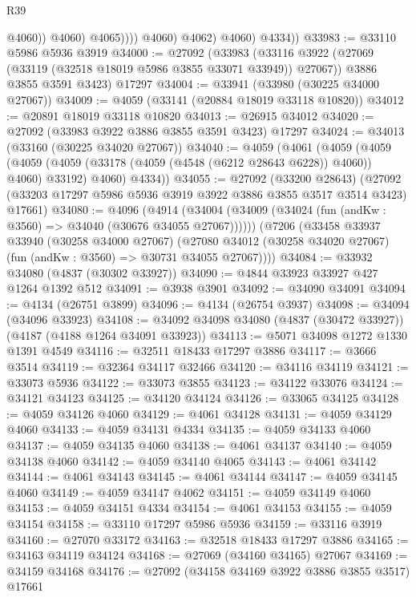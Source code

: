 \begin{lexlean}{R39}
\begin{coremodule}
                            @4060))
                        @4060)
                      @4065))))
              @4060)
            @4062)
          @4060)
        @4334))
@33983 := @33110 @5986 @5936 @3919
@34000 := @27092
    (@33983
      (@33116 @3922 (@27069 (@33119 (@32518 @18019 @5986 @3855 @33071 @33949)) @27067))
      @3886
      @3855
      @3591
      @3423)
    @17297
@34004 := @33941 (@33980 (@30225 @34000 @27067))
@34009 := @4059 (@33141 (@20884 @18019 @33118 @10820))
@34012 := @20891 @18019 @33118 @10820
@34013 := @26915 @34012
@34020 := @27092 (@33983 @3922 @3886 @3855 @3591 @3423) @17297
@34024 := @34013 (@33160 (@30225 @34020 @27067))
@34040 := @4059
    (@4061
      (@4059
        (@4059
          (@4059 (@4059 (@33178 (@4059 (@4548 (@6212 @28643 @6228)) @4060)) @4060) @33192)
          @4060)
        @4334))
@34055 := @27092
    (@33200 @28643)
    (@27092 (@33203 @17297 @5986 @5936 @3919 @3922 @3886 @3855 @3517 @3514 @3423) @17661)
@34080 := @4096
    (@4914 (@34004 (@34009 (@34024 (fun (andKw : @3560) => @34040 (@30676 @34055 @27067))))))
    (@7206
      (@33458
        @33937
        @33940
        (@30258 @34000 @27067)
        (@27080 @34012 (@30258 @34020 @27067) (fun (andKw : @3560) => @30731 @34055 @27067))))
@34084 := @33932 @34080 (@4837 (@30302 @33927))
@34090 := @4844 @33923 @33927 @427 @1264 @1392 @512
@34091 := @3938 @3901
@34092 := @34090 @34091
@34094 := @4134 (@26751 @3899)
@34096 := @4134 (@26754 @3937)
@34098 := @34094 (@34096 @33923)
@34108 := @34092 @34098 @34080 (@4837 (@30472 @33927)) (@4187 (@4188 @1264 @34091 @33923))
@34113 := @5071 @34098 @1272 @1330 @1391 @4549
@34116 := @32511 @18433 @17297 @3886
@34117 := @3666 @3514
@34119 := @32364 @34117 @32466
@34120 := @34116 @34119
@34121 := @33073 @5936
@34122 := @33073 @3855
@34123 := @34122 @33076
@34124 := @34121 @34123
@34125 := @34120 @34124
@34126 := @33065 @34125
@34128 := @4059 @34126 @4060
@34129 := @4061 @34128
@34131 := @4059 @34129 @4060
@34133 := @4059 @34131 @4334
@34135 := @4059 @34133 @4060
@34137 := @4059 @34135 @4060
@34138 := @4061 @34137
@34140 := @4059 @34138 @4060
@34142 := @4059 @34140 @4065
@34143 := @4061 @34142
@34144 := @4061 @34143
@34145 := @4061 @34144
@34147 := @4059 @34145 @4060
@34149 := @4059 @34147 @4062
@34151 := @4059 @34149 @4060
@34153 := @4059 @34151 @4334
@34154 := @4061 @34153
@34155 := @4059 @34154
@34158 := @33110 @17297 @5986 @5936
@34159 := @33116 @3919
@34160 := @27070 @33172
@34163 := @32518 @18433 @17297 @3886
@34165 := @34163 @34119 @34124
@34168 := @27069 (@34160 @34165) @27067
@34169 := @34159 @34168
@34176 := @27092 (@34158 @34169 @3922 @3886 @3855 @3517) @17661

\end{coremodule}
\end{lexlean}
